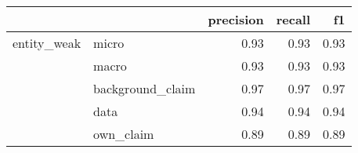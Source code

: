 \begin{tabular}{llrrr}
\toprule
            &           &  precision &  recall &   f1 \\
\midrule
entity\_weak & micro &       0.93 &    0.93 & 0.93 \\
            & macro &       0.93 &    0.93 & 0.93 \\
            & background\_claim &       0.97 &    0.97 & 0.97 \\
            & data &       0.94 &    0.94 & 0.94 \\
            & own\_claim &       0.89 &    0.89 & 0.89 \\
\bottomrule
\end{tabular}

